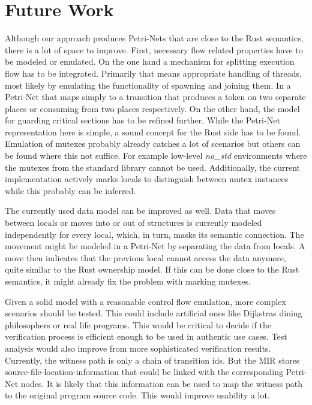 \chapter{Future Work}
\label{future}
Although our approach produces Petri-Nets that are close to the Rust semantics, there is a lot of space to improve.
First, necessary flow related properties have to be modeled or emulated.
On the one hand a mechanism for splitting execution flow has to be integrated.
Primarily that means appropriate handling of threads, most likely by emulating the functionality of spawning and joining them.
In a Petri-Net that maps simply to a transition that produces a token on two separate places or consuming from two places respectively.
On the other hand, the model for guarding critical sections has to be refined further.
While the Petri-Net representation here is simple, a sound concept for the Rust side has to be found.
Emulation of mutexes probably already catches a lot of scenarios but others can be found where this not suffice.
For example low-level \textit{no\_std} environments where the mutexes from the standard library cannot be used.
Additionally, the current implementation actively marks locals to distinguish between mutex instances while this probably can be inferred.

The currently used data model can be improved as well.
Data that moves between locals or moves into or out of structures is currently modeled independently for every local, which, in turn, masks its semantic connection.
The movement might be modeled in a Petri-Net by separating the data from locals.
A move then indicates that the previous local cannot access the data anymore, quite similar to the Rust ownership model.
If this can be done close to the Rust semantics, it might already fix the problem with marking mutexes.

Given a solid model with a reasonable control flow emulation, more complex scenarios should be tested.
This could include artificial ones like Dijkstras dining philosophers \cite{dijkstra1971hierarchical} or real life programs.
This would be critical to decide if the verification process is efficient enough to be used in authentic use cases.
Test analysis would also improve from more sophisticated verification results.
Currently, the witness path is only a chain of transition ids.
But the MIR stores source-file-location-information that could be linked with the corresponding Petri-Net nodes.
It is likely that this information can be used to map the witness path to the original program source code.
This would improve usability a lot.

